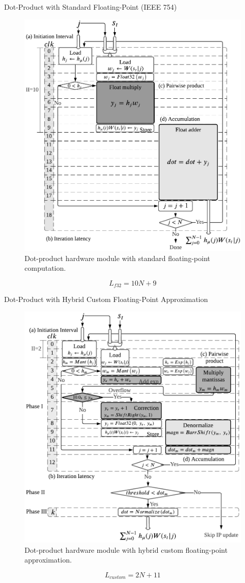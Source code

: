 \begin{frame}{Dot-Product with Standard Floating-Point (IEEE 754)}
	\begin{figure}
		\centering
		\includegraphics[width=0.4\columnwidth]{../chapters/sbs_accelerator/figures/dot_product_float.pdf}
		\caption{\scriptsize Dot-product hardware module with standard floating-point computation.}
	\end{figure}
\scriptsize
	
	\vfill %
	
	\[
	 L_{f32}=10N+9
	\]
\end{frame}

\begin{frame}{Dot-Product with Hybrid Custom Floating-Point Approximation}
	\begin{figure}
		\centering
		\includegraphics[width=0.4\columnwidth]{../chapters/sbs_accelerator/figures/dot_product.pdf}
		\caption{\scriptsize Dot-product hardware module with hybrid custom floating-point approximation.}
	\end{figure}
	\scriptsize
	
	\vfill %
	
	\[
	L_{custom}=2N+11
	\]
\end{frame}

